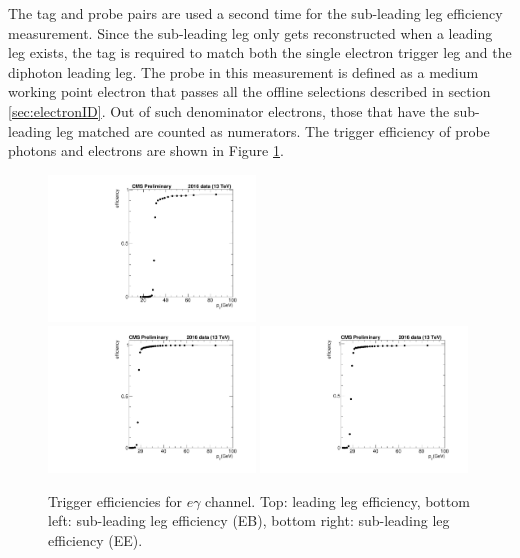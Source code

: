 \documentclass[thesis.tex]{subfiles}
\renewcommand\_{\textunderscore\allowbreak}
\begin{document}
The tag and probe pairs are used a second time for the sub-leading leg efficiency measurement. 
Since the sub-leading leg only gets reconstructed when a leading leg exists, the tag is required to match both the single electron trigger leg and the diphoton leading leg. 
The probe in this measurement is defined as a medium working point electron that passes all the offline selections described in section \ref{sec:electronID}. 
Out of such denominator electrons, those that have the sub-leading leg matched are counted as numerators. 
The trigger efficiency of probe photons and electrons are shown in Figure \ref{fig:egtriggereff}.

\begin{figure}[tb]
  \centering
    \includegraphics[width=0.49\textwidth]{Figures/egTrigger_2016_leading.pdf}\\
    \includegraphics[width=0.49\textwidth]{Figures/egTrigger_2016_trailingEB.pdf}
    \includegraphics[width=0.49\textwidth]{Figures/egTrigger_2016_trailingEE.pdf}
  \caption{Trigger efficiencies for $e\gamma$ channel. Top: leading leg efficiency, bottom left: sub-leading leg efficiency (EB), bottom right: sub-leading leg efficiency (EE).}
  \label{fig:egtriggereff}
\end{figure}
\end{document}
